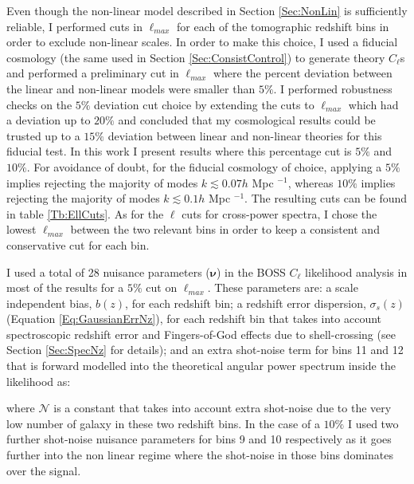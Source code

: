 \qquad Even though the non-linear model described in Section \ref{Sec:NonLin} is sufficiently reliable, I performed cuts in $\ell_{max}$ for each of the tomographic redshift bins in order to exclude non-linear scales. In order to make this choice, I used a fiducial cosmology (the same used in Section \ref{Sec:ConsistControl}) to generate theory $C_{\ell}$s and performed a preliminary cut in $\ell_{max}$ where the percent deviation between the linear and non-linear models were smaller than $5\%$. I performed robustness checks on the $5\%$ deviation cut choice by extending the cuts to $\ell_{max}$ which had a deviation up to $20\%$ and concluded that my cosmological results could be trusted up to a $15\%$ deviation between linear and non-linear theories for this fiducial test. In this work I present results where this percentage cut is $5\%$ and $10\%$. For avoidance of doubt, for the fiducial cosmology of choice, applying a $5\%$ implies rejecting the majority of modes $k \lesssim 0.07 h$ Mpc $^{-1}$, whereas $10\%$ implies rejecting the majority of modes $k \lesssim 0.1 h$ Mpc $^{-1}$. The resulting cuts can be found in table \ref{Tb:EllCuts}. As for the $\ell$ cuts for cross-power spectra, I chose the lowest $\ell_{max}$ between the two relevant bins in order to keep a consistent and conservative cut for each bin.

\qquad I used a total of 28 nuisance parameters ($\pmb{\nu}$) in the BOSS $C_{\ell}$ likelihood analysis in most of the results for a $5\%$ cut on $\ell_{max}$. These parameters are: a scale independent bias, $b(z)$, for each redshift bin; a redshift error dispersion, $\sigma_s(z)$ (Equation \ref{Eq:GaussianErrNz}), for each redshift bin that takes into account spectroscopic redshift error and Fingers-of-God effects due to shell-crossing (see Section \ref{Sec:SpecNz} for details); and an extra shot-noise term for bins 11 and 12 that is forward modelled into the theoretical angular power spectrum inside the likelihood as:

where $\mathcal{N}$ is a constant that takes into account extra shot-noise due to the very low number of galaxy in these two redshift bins. In the case of a $10\%$ I used two further shot-noise nuisance parameters for bins 9 and 10 respectively as it goes further into the non linear regime where the shot-noise in those bins dominates over the signal.

